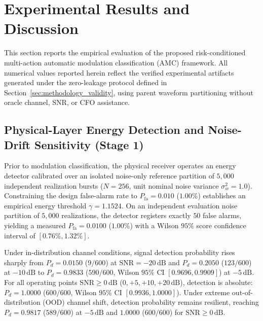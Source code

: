 \section{Experimental Results and Discussion}
\label{sec:results_discussion}

This section reports the empirical evaluation of the proposed risk-conditioned multi-action automatic modulation classification (AMC) framework. All numerical values reported herein reflect the verified experimental artifacts generated under the zero-leakage protocol defined in Section~\ref{sec:methodology_validity}, using parent waveform partitioning without oracle channel, SNR, or CFO assistance.

\subsection{Physical-Layer Energy Detection and Noise-Drift Sensitivity (Stage 1)}
\label{subsec:energy_detection_results}

Prior to modulation classification, the physical receiver operates an energy detector calibrated over an isolated noise-only reference partition of $5{,}000$ independent realization bursts ($N = 256$, unit nominal noise variance $\sigma_w^2 = 1.0$). Constraining the design false-alarm rate to $P_{\mathrm{fa}} = 0.010$ ($1.00\%$) establishes an empirical energy threshold $\gamma = 1.1524$. On an independent evaluation noise partition of $5{,}000$ realizations, the detector registers exactly $50$ false alarms, yielding a measured $P_{\mathrm{fa}} = 0.0100$ ($1.00\%$) with a Wilson $95\%$ score confidence interval of $[0.76\%, 1.32\%]$.

Under in-distribution channel conditions, signal detection probability rises sharply from $P_d = 0.0150$ ($9/600$) at $\mathrm{SNR} = -20\,\mathrm{dB}$ and $P_d = 0.2050$ ($123/600$) at $-10\,\mathrm{dB}$ to $P_d = 0.9833$ ($590/600$, Wilson $95\%$ CI $[0.9696, 0.9909]$) at $-5\,\mathrm{dB}$. For all operating points $\mathrm{SNR} \ge 0\,\mathrm{dB}$ ($0, +5, +10, +20\,\mathrm{dB}$), detection is absolute: $P_d = 1.0000$ ($600/600$, Wilson $95\%$ CI $[0.9936, 1.0000]$). Under extreme out-of-distribution (OOD) channel shift, detection probability remains resilient, reaching $P_d = 0.9817$ ($589/600$) at $-5\,\mathrm{dB}$ and $1.0000$ ($600/600$) for $\mathrm{SNR} \ge 0\,\mathrm{dB}$.

